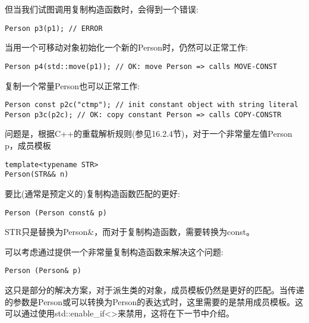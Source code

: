 但当我们试图调用复制构造函数时，会得到一个错误:

\begin{lstlisting}[style=styleCXX]
Person p3(p1); // ERROR
\end{lstlisting}

当用一个可移动对象初始化一个新的Person时，仍然可以正常工作:

\begin{lstlisting}[style=styleCXX]
Person p4(std::move(p1)); // OK: move Person => calls MOVE-CONST
\end{lstlisting}

复制一个常量Person也可以正常工作:

\begin{lstlisting}[style=styleCXX]
Person const p2c("ctmp"); // init constant object with string literal
Person p3c(p2c); // OK: copy constant Person => calls COPY-CONSTR
\end{lstlisting}

问题是，根据C++的重载解析规则(参见16.2.4节)，对于一个非常量左值Person p，成员模板

\begin{lstlisting}[style=styleCXX]
template<typename STR>
Person(STR&& n)
\end{lstlisting}

要比(通常是预定义的)复制构造函数匹配的更好:

\begin{lstlisting}[style=styleCXX]
Person (Person const& p)
\end{lstlisting}

STR只是替换为Person\&，而对于复制构造函数，需要转换为const。

可以考虑通过提供一个非常量复制构造函数来解决这个问题:

\begin{lstlisting}[style=styleCXX]
Person (Person& p)
\end{lstlisting}

这只是部分的解决方案，对于派生类的对象，成员模板仍然是更好的匹配。当传递的参数是Person或可以转换为Person的表达式时，这里需要的是禁用成员模板。这可以通过使用std::enable\_if<>来禁用，这将在下一节中介绍。
































